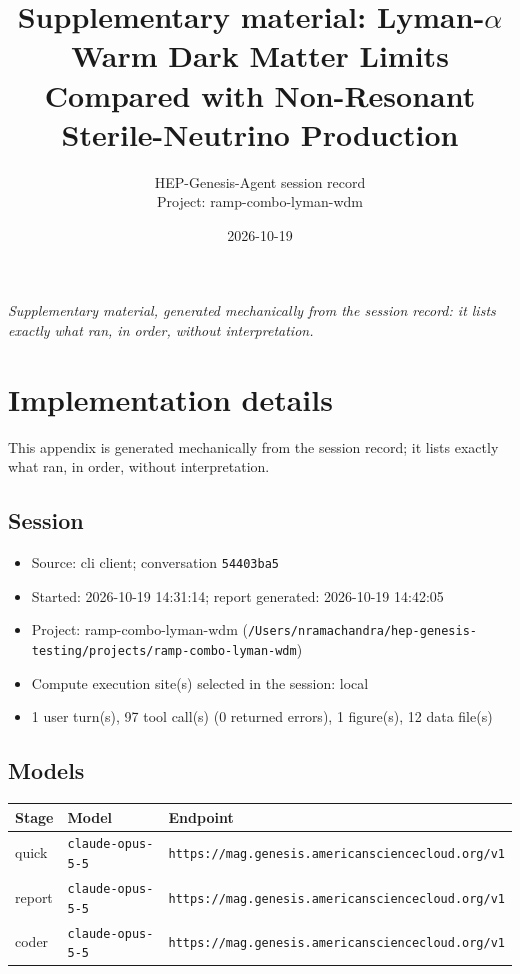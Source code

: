 \documentclass[11pt,a4paper]{article}
\title{Supplementary material: Lyman-$\alpha$ Warm Dark Matter Limits Compared with Non-Resonant Sterile-Neutrino Production}
\author{HEP-Genesis-Agent session record \\ \small Project: ramp-combo-lyman-wdm}
\date{2026-10-19}
\begin{document}
\maketitle
\noindent\textit{\small Supplementary material, generated mechanically from the session record: it lists exactly what ran, in order, without interpretation.}
\vspace{1em}



\appendix
\section{Implementation details}
\label{app:impl}
This appendix is generated mechanically from the session record; it lists exactly what ran, in order, without interpretation.
\subsection{Session}
\begin{itemize}
  \item Source: cli client; conversation \texttt{54403ba5}
  \item Started: 2026-10-19 14:31:14; report generated: 2026-10-19 14:42:05
  \item Project: ramp-combo-lyman-wdm (\texttt{/\allowbreak{}Users/\allowbreak{}nramachandra/\allowbreak{}hep-genesis-testing/\allowbreak{}projects/\allowbreak{}ramp-combo-lyman-wdm})
  \item Compute execution site(s) selected in the session: local
  \item 1 user turn(s), 97 tool call(s) (0 returned errors), 1 figure(s), 12 data file(s)
\end{itemize}
\subsection{Models}
\begin{longtable}{@{}p{}p{}p{}@{}}
\toprule Stage & Model & Endpoint \\ \midrule \endhead
quick & \texttt{claude-opus-5-5} & \texttt{https:\allowbreak{}/\allowbreak{}/\allowbreak{}mag.genesis.americansciencecloud.org/\allowbreak{}v1} \\
report & \texttt{claude-opus-5-5} & \texttt{https:\allowbreak{}/\allowbreak{}/\allowbreak{}mag.genesis.americansciencecloud.org/\allowbreak{}v1} \\
coder & \texttt{claude-opus-5-5} & \texttt{https:\allowbreak{}/\allowbreak{}/\allowbreak{}mag.genesis.americansciencecloud.org/\allowbreak{}v1} \\
\bottomrule\end{longtable}
\end{document}
